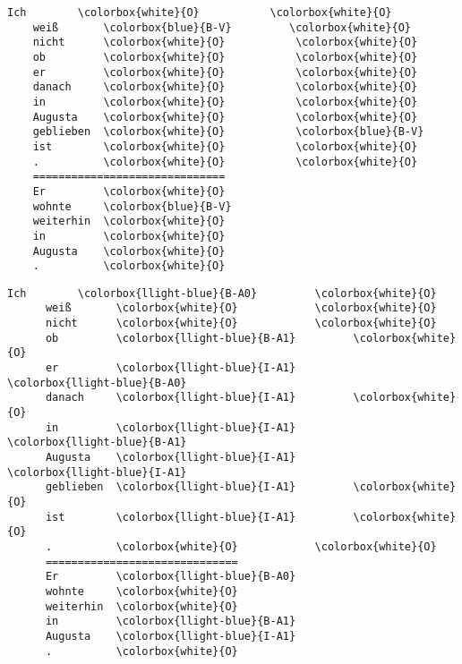 {\begingroup
\begin{srl}[!h]
\centering
  \begin{minipage}{0.45\linewidth}
  \vspace{0pt}
    \begin{BVerbatim}[commandchars=\\\{\}, fontsize=\footnotesize]
    Ich        \colorbox{white}{O}           \colorbox{white}{O}
    weiß       \colorbox{blue}{B-V}         \colorbox{white}{O}
    nicht      \colorbox{white}{O}           \colorbox{white}{O}
    ob         \colorbox{white}{O}           \colorbox{white}{O}
    er         \colorbox{white}{O}           \colorbox{white}{O}
    danach     \colorbox{white}{O}           \colorbox{white}{O}
    in         \colorbox{white}{O}           \colorbox{white}{O}
    Augusta    \colorbox{white}{O}           \colorbox{white}{O}
    geblieben  \colorbox{white}{O}           \colorbox{blue}{B-V}
    ist        \colorbox{white}{O}           \colorbox{white}{O}
    .          \colorbox{white}{O}           \colorbox{white}{O}
    ==============================
    Er         \colorbox{white}{O}
    wohnte     \colorbox{blue}{B-V}
    weiterhin  \colorbox{white}{O}
    in         \colorbox{white}{O}
    Augusta    \colorbox{white}{O}
    .          \colorbox{white}{O}
    \end{BVerbatim}
  \end{minipage}
  \hfill
  \begin{minipage}{0.45\linewidth}
  \vspace{0pt}
    \begin{BVerbatim}[commandchars=\\\{\}, fontsize=\footnotesize]
      Ich        \colorbox{llight-blue}{B-A0}         \colorbox{white}{O}
      weiß       \colorbox{white}{O}            \colorbox{white}{O}
      nicht      \colorbox{white}{O}            \colorbox{white}{O}
      ob         \colorbox{llight-blue}{B-A1}         \colorbox{white}{O}
      er         \colorbox{llight-blue}{I-A1}         \colorbox{llight-blue}{B-A0}
      danach     \colorbox{llight-blue}{I-A1}         \colorbox{white}{O}
      in         \colorbox{llight-blue}{I-A1}         \colorbox{llight-blue}{B-A1}
      Augusta    \colorbox{llight-blue}{I-A1}         \colorbox{llight-blue}{I-A1}
      geblieben  \colorbox{llight-blue}{I-A1}         \colorbox{white}{O}
      ist        \colorbox{llight-blue}{I-A1}         \colorbox{white}{O}
      .          \colorbox{white}{O}            \colorbox{white}{O}
      ==============================
      Er         \colorbox{llight-blue}{B-A0}
      wohnte     \colorbox{white}{O}
      weiterhin  \colorbox{white}{O}
      in         \colorbox{llight-blue}{B-A1}
      Augusta    \colorbox{llight-blue}{I-A1}
      .          \colorbox{white}{O}
    \end{BVerbatim}
  \end{minipage}
\end{srl}
\label{srl:ablation}
\endgroup

}

